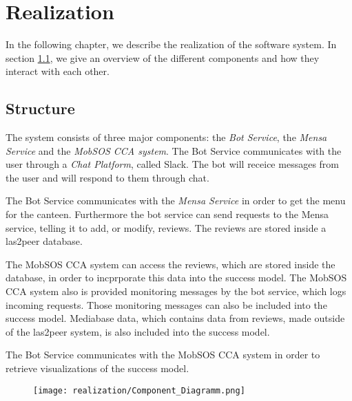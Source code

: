 \chapter{Realization}

In the following chapter, we describe the realization of the software system. In section \ref{sec:structure}, we give an overview of the different components and how they interact with each other.

\section{Structure}\label{sec:structure}

The system consists of three major components: the \emph{Bot Service}, the \emph{Mensa Service} and the \emph{MobSOS CCA system}. The Bot Service communicates with the user through a \emph{Chat Platform}, called Slack. The bot will receice messages from the user and will respond to them through chat.

The Bot Service communicates with the \emph{Mensa Service} in order to get the menu for the canteen. Furthermore the bot service can send requests to the Mensa service, telling it to add, or modify, reviews. The reviews are stored inside a las2peer database.

The MobSOS CCA system can access the reviews, which are stored inside the database, in order to incprporate this data into the success model. The MobSOS CCA system also is provided monitoring messages by the bot service, which logs incoming requests. Those monitoring messages can also be included into the success model. Mediabase data, which contains data from reviews, made outside of the las2peer system, is also included into the success model.

The Bot Service communicates with the MobSOS CCA system in order to retrieve visualizations of the success model.
\begin{figure}[h!]
    \centering
    \texttt{[image: realization/Component\_Diagramm.png]}
\end{figure}